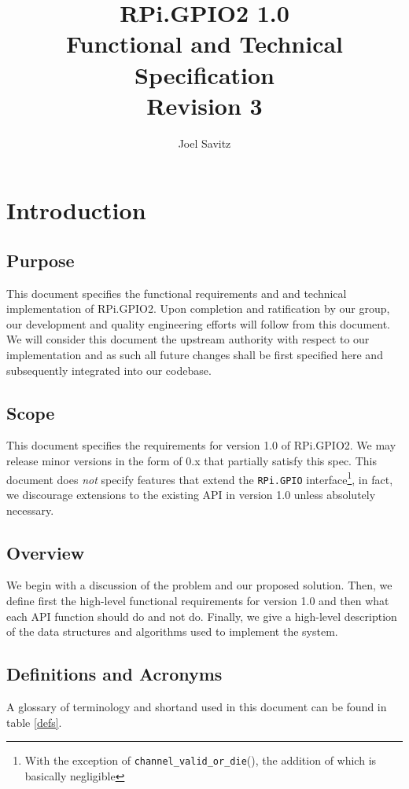 \documentclass[12pt]{article}
\title{
{RPi.GPIO2 1.0} \\ {Functional and Technical Specification } \\
{\normalsize Revision 3}
}
\author{Joel Savitz}
\begin{document}
\maketitle

\section{Introduction}
\subsection{Purpose}
This document specifies the functional requirements and and technical implementation of RPi.GPIO2. Upon completion and ratification by our group, our development and quality engineering efforts will follow from this document. We will consider this document the upstream authority with respect to our implementation and as such all future changes shall be first specified here and subsequently integrated into our codebase.


\subsection{Scope}
This document specifies the requirements for version 1.0 of RPi.GPIO2.
We may release minor versions in the form of 0.x that partially satisfy this spec.
This document does \textit{not} specify features that extend the \texttt{RPi.GPIO}
interface\footnote{With the exception of \texttt{channel\_valid\_or\_die}(), the addition of which is basically negligible}, in fact, we discourage extensions to the existing API
in version 1.0 unless absolutely necessary.


\subsection{Overview}
We begin with a discussion of the problem and our proposed solution. Then, we define first the high-level functional requirements for version 1.0 and then what each API function should do and not do. Finally, we give a high-level description of the data structures and algorithms used to implement the system.


\subsection{Definitions and Acronyms}

A glossary of terminology and shortand used in this document can be found in table \ref{defs}.
\end{document}
